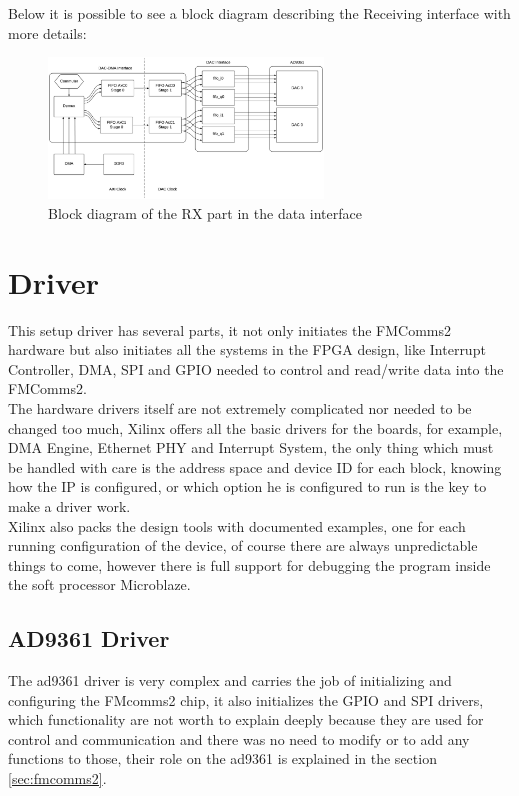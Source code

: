 Below it is possible to see a block diagram describing the Receiving interface with
more details:

\begin{figure}[htbp]
    \centering
    \includegraphics[width=0.65\textwidth]{./figures/txdata_if}
    \caption{ Block diagram of the RX part in the data interface
    \label{fig:dataifrx}}
\end{figure}

\section{Driver}

This setup driver has several parts, it not only initiates the FMComms2 hardware
but also initiates all the systems in the FPGA design, like Interrupt Controller,
 DMA, SPI and GPIO needed to control and read/write data into the FMComms2.\\

The hardware drivers itself are not extremely complicated nor needed to be changed
too much, Xilinx offers all the basic drivers for the boards, for example, DMA Engine,
Ethernet PHY and Interrupt System, the only thing which must be handled with care is
the address space and device ID for each block, knowing how the IP is configured,
or which option he is configured to run is the key to make a driver work.\\

Xilinx also packs the design tools with documented examples, one for each running
configuration of the device, of course there are always unpredictable things to come,
however there is full support for debugging the program inside the soft processor
Microblaze.

\subsection{AD9361 Driver}

The ad9361 driver is very complex and carries the job of initializing and
configuring the FMcomms2 chip, it also initializes the GPIO and SPI drivers,
which functionality are not worth to explain deeply because they are used for
control and communication and there was no need to modify or to add any
functions to those, their role on the ad9361 is explained in the section
\ref{sec:fmcomms2}.\\

